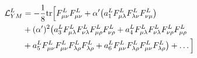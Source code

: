\begin{equation}\begin{split}\label{eq7}
{\cal L}^L_{YM} &= -\frac18{\rm tr}\Big[F^L_{\mu\nu}F^L_{\mu\nu}   +
\alpha'\big(a^L_1 F^L_{\mu\lambda}F^L_{\lambda\nu}F^L_{\nu\mu}\big)\\&
+(\alpha')^2\big(a^L_3F^L_{\mu\lambda}F^L_{\nu\lambda}F^L_{\mu\rho}F^L_{\nu\rho}+a^L_4F^L_{\mu\lambda}F^L_{\nu\lambda}F^L_{\nu\rho}F^L_{\mu\rho}\\
&+a^L_5F^L_{\mu\nu}F^L_{\mu\nu}F^L_{\lambda\rho}F^L_{\lambda\rho}
+a^L_6F^L_{\mu\nu}F^L_{\lambda\rho}F^L_{\mu\nu}F^L_{\lambda\rho}\big)
+\ldots \Big]\end{split}\end{equation}

